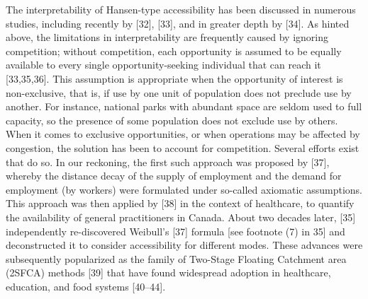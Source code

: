 \documentclass[10pt,letterpaper]{article}
\begin{document}
The interpretability of Hansen-type accessibility has been discussed in
numerous studies, including recently by {[}32{]}, {[}33{]}, and in
greater depth by {[}34{]}. As hinted above, the limitations in
interpretability are frequently caused by ignoring competition; without
competition, each opportunity is assumed to be equally available to
every single opportunity-seeking individual that can reach it
{[}33,35,36{]}. This assumption is appropriate when the opportunity of
interest is non-exclusive, that is, if use by one unit of population
does not preclude use by another. For instance, national parks with
abundant space are seldom used to full capacity, so the presence of some
population does not exclude use by others. When it comes to exclusive
opportunities, or when operations may be affected by congestion, the
solution has been to account for competition. Several efforts exist that
do so. In our reckoning, the first such approach was proposed by
{[}37{]}, whereby the distance decay of the supply of employment and the
demand for employment (by workers) were formulated under so-called
axiomatic assumptions. This approach was then applied by {[}38{]} in the
context of healthcare, to quantify the availability of general
practitioners in Canada. About two decades later, {[}35{]} independently
re-discovered Weibull's {[}37{]} formula {[}see footnote (7) in 35{]}
and deconstructed it to consider accessibility for different modes.
These advances were subsequently popularized as the family of Two-Stage
Floating Catchment area (2SFCA) methods {[}39{]} that have found
widespread adoption in healthcare, education, and food systems
{[}40--44{]}.
\end{document}
